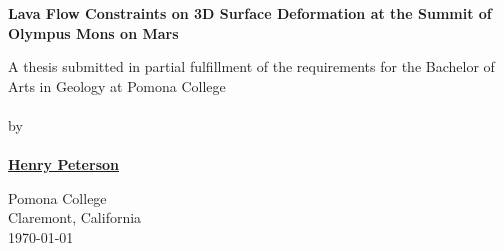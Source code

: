 \begin{titlepage}
    \begin{center}

        \phantom{.}

        \vfill
 
        \large\textbf{Lava Flow Constraints on 3D Surface Deformation at the Summit of Olympus Mons on Mars}

        \vfill
        \vfill
        \vfill

        A thesis submitted in partial fulfillment of the requirements for the Bachelor of Arts in Geology at Pomona College
        \\~\\
        by
        \\~\\
        \textbf{\href{mailto:hgpa2018@mymail.pomona.edu}{Henry Peterson}}
             
        \vfill
        \vfill
        \vfill

        Pomona College\\
        Claremont, California\\
        \today

    \end{center}
 \end{titlepage}
